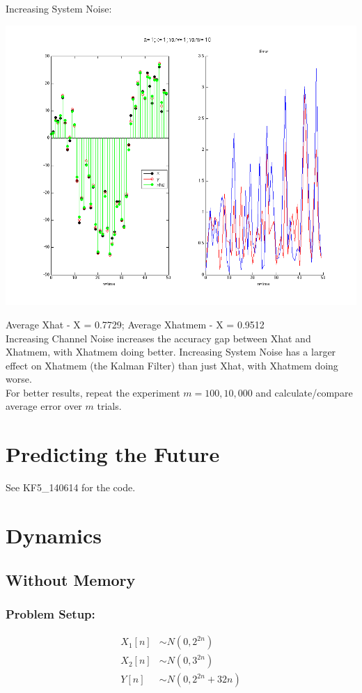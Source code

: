 \documentclass[leqno]{article}
\begin{document}
Increasing System Noise:
\begin{center}
\includegraphics[scale=0.3]{fig9}
\end{center}
Average Xhat - X = 0.7729; \quad Average Xhatmem - X = 0.9512\\

Increasing Channel Noise increases the accuracy gap between Xhat and Xhatmem, with Xhatmem doing better. Increasing System Noise has a larger effect on Xhatmem (the Kalman Filter) than just Xhat, with Xhatmem doing worse. \\

For better results, repeat the experiment $m=100, 10,000$ and calculate/compare average error over $m$ trials.

\section{Predicting the Future}
See KF5\_140614 for the code.

\section{Dynamics}
\subsection{Without Memory}
\subsubsection{Problem Setup:}
\begin{align*}
X_1[n] &\sim N(0, 2^{2n})\\
X_2[n] &\sim N(0, 3^{2n})\\
Y[n] &\sim N(0, 2^{2n} + 3{2n})\\
\end{align*}
\end{document}
